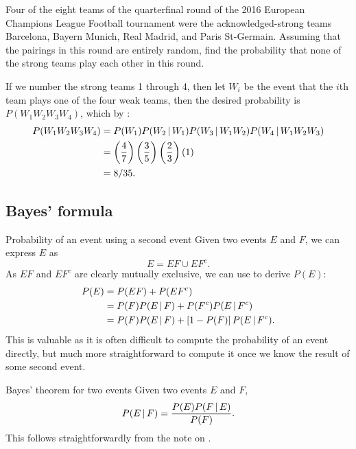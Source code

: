 \begin{changebar}
    \begin{example}
        Four of the eight teams of the quarterfinal round of the 2016 European Champions League Football tournament were the acknowledged-strong teams Barcelona, Bayern Munich, Real Madrid, and Paris St-Germain. Assuming that the pairings in this round are entirely random, find the probability that none of the strong teams play each other in this round.
    \end{example}
    \begin{solution}
        If we number the strong teams 1 through 4, then let $W_i$ be the event that the $i$th team plays one of the four weak teams, then the desired probability is $P(W_1W_2W_3W_4)$, which by : \[
            \begin{aligned}
                P(W_1W_2W_3W_4) &= P(W_1)P(W_2 \,\vert\, W_1)P(W_3 \,\vert\, W_1W_2)P(W_4 \,\vert\, W_1W_2W_3) \\
                &= \left(\frac{4}{7}\right)\left(\frac{3}{5}\right)\left(\frac{2}{3}\right)\left( 1 \right) \\
                &= 8/35.
            \end{aligned}
        \]
    \end{solution}
\end{changebar}
\pagebreak
\subsection{Bayes' formula}
\begin{bdef}{Probability of an event using a second event}\label{psecond}
Given two events $E$ and $F$, we can express $E$ as \[
    E = EF \cup EF^c.    
\] As $EF$ and $EF^c$ are clearly mutually exclusive, we can use  to derive $P(E)$: \[
    \begin{aligned}
        P(E) &= P(EF) + P(EF^c) \\
        &= P(F)P(E \,\vert\, F) + P(F^c)P(E \,\vert\, F^c) \\
        &= P(F)P(E \,\vert\, F) + \left[ 1 - P(F) \right]P(E \,\vert\, F^c).
    \end{aligned}    
\] This is valuable as it is often difficult to compute the probability of an event directly, but much more straightforward to compute it once we know the result of some second event.
\end{bdef}
\begin{bdef}{Bayes' theorem for two events}\label{bayes}
    Given two events $E$ and $F$, \[
        P(E \,\vert\, F) = \frac{P(E)P(F \,\vert\, E)}{P(F)}.    
    \] This follows straightforwardly from the note on .
\end{bdef}

